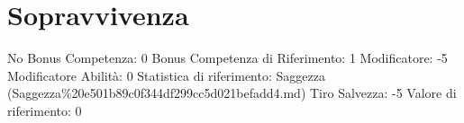 \section{Sopravvivenza}\label{sopravvivenza}

\begin{description}
\tightlist
\item[Tags: ABI]
No Bonus Competenza: 0 Bonus Competenza di Riferimento: 1 Modificatore:
-5 Modificatore Abilità: 0 Statistica di riferimento: Saggezza
(Saggezza\%20e501b89c0f344df299cc5d021befadd4.md) Tiro Salvezza: -5
Valore di riferimento: 0
\end{description}
